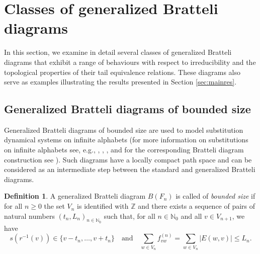 \documentclass[11pt, twoside]{amsart}
\theoremstyle{definition}
\newtheorem{definition}{Definition}[section]
\theoremstyle{remark}
\theoremstyle{plain}
\newcommand{\tcr}{\textcolor{red}}
\newcommand{\N}{\mathbb N}
\numberwithin{equation}{section}
\begin{document}


\section{Classes of generalized Bratteli diagrams}\label{sec:examples}

In this section, we examine in detail several classes of generalized Bratteli diagrams that exhibit a range of behaviours with respect to irreducibility and the topological properties of their tail equivalence relations.
These diagrams also serve as examples illustrating the results presented in Section \ref{sec:mainres}.


\subsection{Generalized Bratteli diagrams of bounded size}\label{subsec:bdd}

Generalized Bratteli diagrams of bounded size  
are used to 
model substitution dynamical systems on infinite alphabets 
(for more information on substitutions on infinite alphabets see, e.g., \cite{Ferenczi_2006}, \cite{DomingosFerencziMessaoudiValle2024}, \cite{Frettloh_Garber_Manibo_2022}, and for the corresponding Bratteli diagram construction see \cite{BezuglyiJorgensenSanadhya2024}). %
Such diagrams have a locally compact path space and can be considered as an intermediate step between 
the standard and generalized Bratteli diagrams. 





\begin{definition}\label{Def:BD_bdd_size} A generalized Bratteli 
diagram $B(F_n)$ is called of \textit{bounded size} if for all $n \geq 0$ the set $V_n$ is identified with $\mathbb{Z}$ and there exists 
a sequence of pairs of natural numbers $(t_n, L_n)_{n \in \N_0}$ 
such that, for all $n \in \mathbb{N}_0$ and all $v \in V_{n+1}$, we have
\begin{equation}\label{eq: Bndd size}
s(r^{-1}(v)) \in \{v - t_n, \ldots, v + t_n\} \quad \mbox{and} 
\quad \sum_{w \in V_{n}} f^{(n)}_{vw} = \sum_{w \in V_{n}} |E(w,v)| 
\leq L_n.
\end{equation} 
\end{definition} 
\end{document}
